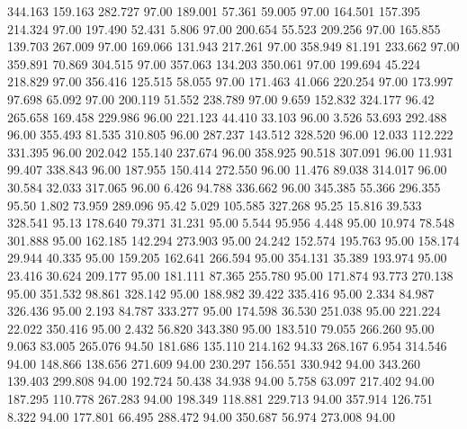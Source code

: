  344.163  159.163  282.727        97.00
 189.001   57.361   59.005        97.00
 164.501  157.395  214.324        97.00
 197.490   52.431    5.806        97.00
 200.654   55.523  209.256        97.00
 165.855  139.703  267.009        97.00
 169.066  131.943  217.261        97.00
 358.949   81.191  233.662        97.00
 359.891   70.869  304.515        97.00
 357.063  134.203  350.061        97.00
 199.694   45.224  218.829        97.00
 356.416  125.515   58.055        97.00
 171.463   41.066  220.254        97.00
 173.997   97.698   65.092        97.00
 200.119   51.552  238.789        97.00
   9.659  152.832  324.177        96.42
 265.658  169.458  229.986        96.00
 221.123   44.410   33.103        96.00
   3.526   53.693  292.488        96.00
 355.493   81.535  310.805        96.00
 287.237  143.512  328.520        96.00
  12.033  112.222  331.395        96.00
 202.042  155.140  237.674        96.00
 358.925   90.518  307.091        96.00
  11.931   99.407  338.843        96.00
 187.955  150.414  272.550        96.00
  11.476   89.038  314.017        96.00
  30.584   32.033  317.065        96.00
   6.426   94.788  336.662        96.00
 345.385   55.366  296.355        95.50
   1.802   73.959  289.096        95.42
   5.029  105.585  327.268        95.25
  15.816   39.533  328.541        95.13
 178.640   79.371   31.231        95.00
   5.544   95.956    4.448        95.00
  10.974   78.548  301.888        95.00
 162.185  142.294  273.903        95.00
  24.242  152.574  195.763        95.00
 158.174   29.944   40.335        95.00
 159.205  162.641  266.594        95.00
 354.131   35.389  193.974        95.00
  23.416   30.624  209.177        95.00
 181.111   87.365  255.780        95.00
 171.874   93.773  270.138        95.00
 351.532   98.861  328.142        95.00
 188.982   39.422  335.416        95.00
   2.334   84.987  326.436        95.00
   2.193   84.787  333.277        95.00
 174.598   36.530  251.038        95.00
 221.224   22.022  350.416        95.00
   2.432   56.820  343.380        95.00
 183.510   79.055  266.260        95.00
   9.063   83.005  265.076        94.50
 181.686  135.110  214.162        94.33
 268.167    6.954  314.546        94.00
 148.866  138.656  271.609        94.00
 230.297  156.551  330.942        94.00
 343.260  139.403  299.808        94.00
 192.724   50.438   34.938        94.00
   5.758   63.097  217.402        94.00
 187.295  110.778  267.283        94.00
 198.349  118.881  229.713        94.00
 357.914  126.751    8.322        94.00
 177.801   66.495  288.472        94.00
 350.687   56.974  273.008        94.00
